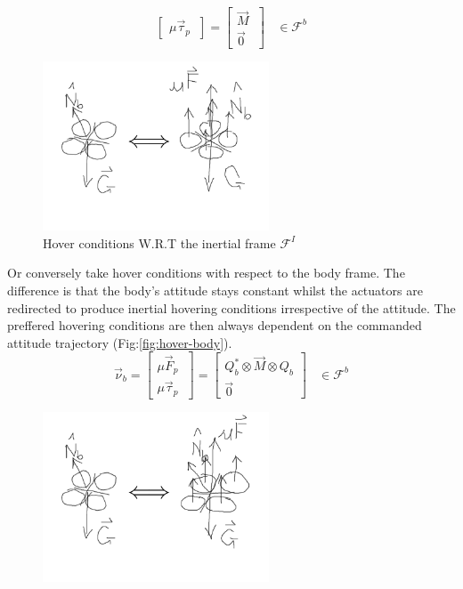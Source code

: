 {\begin{equation}
\begin{bmatrix}
\mu\vec{\tau}_p\hspace{3pt}
\end{bmatrix}
=\begin{bmatrix}
\vec{M}\hspace{3pt}\\
\vec{0}\hspace{3pt}
\end{bmatrix}~~~~\in\mathcal{F}^b
\end{equation}
\begin{figure}[htbp]
\centering
\includegraphics[width=0.6\textwidth]{figs/hover-inertial}
\caption{Hover conditions W.R.T the inertial frame $\mathcal{F}^I$}
\label{fig:hover-inertial}
\end{figure}
\par
Or conversely take hover conditions with respect to the body frame. The difference is that the body's attitude stays constant whilst the actuators are redirected to produce inertial hovering conditions irrespective of the attitude. The preffered hovering conditions are then always dependent on the commanded attitude trajectory (Fig:\ref{fig:hover-body}).
\begin{equation}\label{eq:hover-body}
\vec{\nu}_b=
\begin{bmatrix}
\mu\vec{F}_p\hspace{3pt}\\
\mu\vec{\tau}_p\hspace{3pt}
\end{bmatrix}
=\begin{bmatrix}
Q_b^*\otimes\vec{M}\otimes Q_b\\
\vec{0}
\end{bmatrix}~~~~\in\mathcal{F}^b
\end{equation}
\begin{figure}[htbp]
\centering
\includegraphics[width=0.6\textwidth]{figs/hover-body}

\end{figure}}
